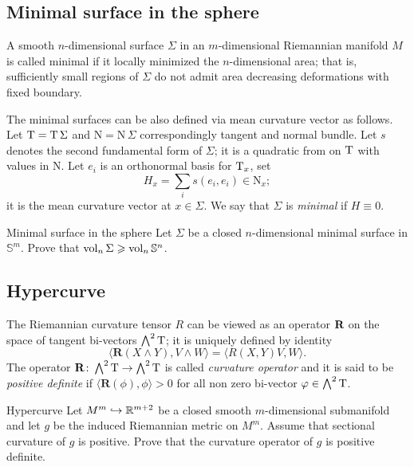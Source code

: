 \subsection*{Minimal surface in the sphere}

\label{minimal surface}
A  smooth $n$-dimensional surface $\Sigma$ in
an $m$-dimensional Riemannian manifold $M$ is called minimal
if it locally minimized the $n$-dimensional area;
that is, sufficiently small regions of $\Sigma$ do not admit area decreasing deformations with fixed boundary.

The minimal surfaces can be also defined via mean curvature vector as follows.
Let $\mathrm{T}=\mathrm{T}\,\Sigma$ and $\mathrm{N}=\mathrm{N}\,\Sigma$ correspondingly tangent and normal bundle.
Let $s$ denotes the second fundamental form of $\Sigma$;
it is a quadratic from on $\mathrm{T}$ with values in $\mathrm{N}$.
Let  $e_i$ is an orthonormal basis for $\mathrm{T}_x$, 
set 
$$H_x=\sum_i s(e_i,e_i)\in \mathrm{N}_x;$$ 
it is the mean curvature vector at $x\in \Sigma$. 
We say that $\Sigma$ is \emph{minimal} if $H\equiv 0$.

\begin{pr}{}{Minimal surface in the sphere}\label{almgren} 
Let $\Sigma$ be a closed $n$-dimensional 
minimal surface
in $\mathbb{S}^m$.
Prove that
$\operatorname{\rm vol}_n \Sigma\geqslant \operatorname{\rm vol}_n \mathbb{S}^n$.
\end{pr}

\subsection*{Hypercurve}

The Riemannian curvature tensor $R$
can be viewed as an operator $\text{\bf R}$ on the space of tangent bi-vectors $\bigwedge^2 \mathrm{T}$;
it is uniquely defined by identity
$$\langle\mathbf{R}(X\wedge Y),V\wedge W\rangle
=
\langle R(X,Y)V,W\rangle.$$
The operator $\mathbf{R}\colon\bigwedge^2 \mathrm{T}\to \bigwedge^2 \mathrm{T}$ is called \emph{curvature operator} and it is said to be {}\emph{positive definite} if
$\langle\mathbf{R}(\phi),\phi\rangle>0$ for all non zero
bi-vector $\varphi\in\bigwedge^2 \mathrm{T}$.


\begin{pr}{}{Hypercurve}\label{codim=2}
Let $M^m\hookrightarrow \mathbb{R}^{m+2}$ be a closed smooth $m$-dimensional
submanifold and let  $g$ be the  induced Riemannian metric on $M^m$.
Assume that sectional curvature of $g$ is positive.
Prove that the curvature operator of $g$ is positive definite.
\end{pr}

